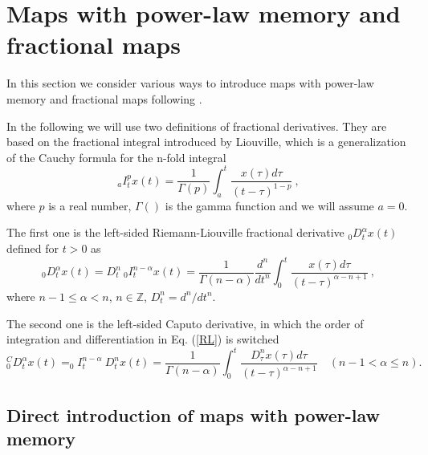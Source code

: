 \documentclass[graybox]{svmult}
\begin{document}
\section{Maps with power-law memory and fractional maps}
\label{sec:2}

In this section we consider various ways to introduce maps with power-law memory and fractional maps following \cite{ME2,ME3,ME4,ME6,ME7,ME8,ME9,Chaos2015,ME1,ME5, T2009a,T2009b,T2,T1,FallC,Fall}.

In the following we will use two definitions of fractional
derivatives. They are based on the fractional integral introduced by Liouville, which is a generalization of the Cauchy formula for the n-fold integral
{\setlength\arraycolsep{0.5pt}
\begin{equation}
 _aI^{p}_t x(t) 
=\frac{1}{\Gamma(p)} \int^{t}_a 
\frac{x(\tau) d \tau}{(t-\tau)^{1-p}}~,
\label{RLI}
\end{equation}
}
where $p$ is a real number, $\Gamma()$ is the gamma function and we will assume $a=0$.

The first one is the left-sided Riemann-Liouville fractional
derivative $_0D^{\alpha}_tx(t)$ 
defined for
$t>0$ \cite{KST,Podlubny,SKM} as 
{\setlength\arraycolsep{0.5pt}
\begin{equation}
_0D^{\alpha}_t x(t)=D^n_t \ _0I^{n-\alpha}_t x(t) 
=\frac{1}{\Gamma(n-\alpha)} \frac{d^n}{dt^n} \int^{t}_0 
\frac{x(\tau) d \tau}{(t-\tau)^{\alpha-n+1}}~,
\label{RL}
\end{equation}
}
where $n-1 \le \alpha < n$, $n \in \mathbb{Z}$,  
$D^n_t=d^n/dt^n$.        

The second one is the left-sided Caputo derivative, in which the order of integration and differentiation in Eq. (\ref{RL}) is switched
\cite{KST}  
{\setlength\arraycolsep{0.5pt}
\begin{equation}
_0^CD^{\alpha}_t x(t)=_0I^{n-\alpha}_t \ D^n_t x(t)
=\frac{1}{\Gamma(n-\alpha)}  \int^{t}_0 
\frac{ D^n_{\tau}x(\tau) d \tau}{(t-\tau)^{\alpha-n+1}}  \quad (n-1 <\alpha \le n).
\label{Cap}
\end{equation}
}



\subsection{Direct introduction of maps with power-law memory}
\label{Direct}
\end{document}
